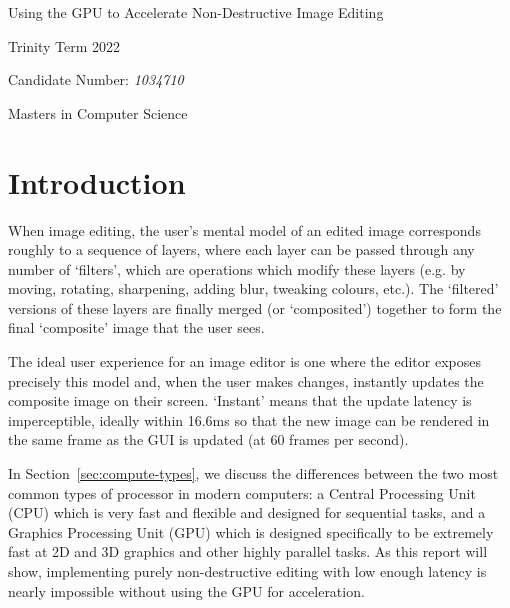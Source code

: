 \documentclass[12pt]{article}
\begin{document}
\begin{titlepage}
    \begin{center}
        \vspace*{1.5in}

        \Huge
        Using the GPU to Accelerate Non-Destructive Image Editing

        \vspace*{2in}

        \Large

        Trinity Term 2022

        \vspace*{0.25in}
        Candidate Number: \emph{1034710}

        \vspace*{0.25in}
        Masters in Computer Science
    \end{center}
\end{titlepage}



\pagebreak

\tableofcontents



\doublespacing

\pagebreak

\section{Introduction}

When image editing, the user's mental model of an edited image corresponds roughly to a sequence of
layers, where each layer can be passed through any number of `filters', which are operations which
modify these layers (e.g. by moving, rotating, sharpening, adding blur, tweaking colours, etc.).
The `filtered' versions of these layers are finally merged (or `composited') together to form the
final `composite' image that the user sees.

The ideal user experience for an image editor is one where the editor exposes precisely this model
and, when the user makes changes, instantly updates the composite image on their screen.  `Instant'
means that the update latency is imperceptible, ideally within 16.6ms so that the new image can be
rendered in the same frame as the GUI is updated (at 60 frames per second).

In Section~\ref{sec:compute-types}, we discuss the differences between the two most common types of
processor in modern computers: a Central Processing Unit (CPU) which is very fast and
flexible and designed for sequential tasks, and a Graphics Processing Unit (GPU) which is designed
specifically to be extremely fast at 2D and 3D graphics and other highly parallel tasks.  As this
report will show, implementing purely non-destructive editing with low enough latency is nearly
impossible without using the GPU for acceleration.
\end{document}
